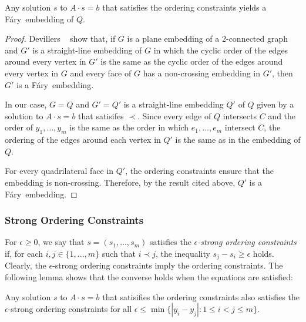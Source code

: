 \documentclass{patmorin}
\newcommand{\Fary}{Fáry}
\begin{document}
\begin{lem}
   Any solution $s$ to $A\cdot s=b$ that satisfies
 the ordering constraints %
 yields a
   \Fary\ embedding of $Q$.
\end{lem}

\begin{proof}
   Devillers \etal\ \cite[Lemma~16]{devillers.liotta.ea:checking} show
   that, if $G$ is a plane embedding of a 2-connected graph and $G'$
   is a straight-line embedding of $G$ in which the cyclic order of the
   edges around every vertex in $G'$ is the same as the cyclic order
   of the edges around every vertex in $G$ and every face of $G$
   has a non-crossing embedding in $G'$, then $G'$ is a \Fary\ embedding.

   In our case, $G=Q$ and $G'=Q'$ is a straight-line embedding $Q'$ of $Q$
   given by a solution to $A\cdot s = b$ that satisifes $\prec$.  Since
   every edge of $Q$ intersects $C$ and the order of $y_1,\ldots,y_m$
   is the same as the order in which $e_1,\ldots,e_m$ intersect $C$, the
   ordering of the edges around each vertex in $Q'$ is the same as in the
   embedding of $Q$. 

   For every quadrilateral face in $Q'$, the ordering constraints
   ensure that the embedding is non-crossing. Therefore, by the result
   cited above, $Q'$ is a \Fary\ embedding. %
\end{proof}


\subsubsection{Strong Ordering Constraints}
\label{strong}

For $\epsilon \ge 0$, we say that $s=(s_1,\ldots,s_m)$ satisfies
the \emph{$\epsilon$-strong ordering constraints} if, for each
$i,j\in\{1,\ldots,m\}$ such that $i\prec j$, the inequality
$s_j-s_i\ge \epsilon$ holds.
Clearly, the $\epsilon$-strong
ordering constraints imply the ordering constraints. The following lemma shows
that the converse holds when the equations are satisfied:

\begin{lem}
   Any solution $s$ to $A\cdot s=b$ that satisifies
the ordering constraints
 also satisfies 
   the $\epsilon$-strong ordering constraints
   for all $\epsilon\le\min\{|y_i-y_j| : 1\le i< j\le m\}$.
\end{lem}
\end{document}
